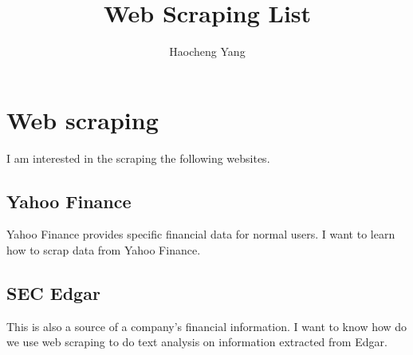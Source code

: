 
\title{Web Scraping List}
\author{Haocheng Yang}



\section{Web scraping}

I am interested in the scraping the following websites.


\subsection{Yahoo Finance}

Yahoo Finance provides specific financial data for normal users. I want to learn how to scrap data from Yahoo Finance.

\subsection{SEC Edgar}

This is also a source of a company's financial information. I want to know how do we use web scraping to do text analysis on information extracted from Edgar.

